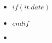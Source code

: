 \begin{itemize}[itemsep=0pt]

  \item {}

  $if(it.date)$\item {}$endif$

  \item {}

\end{itemize}
